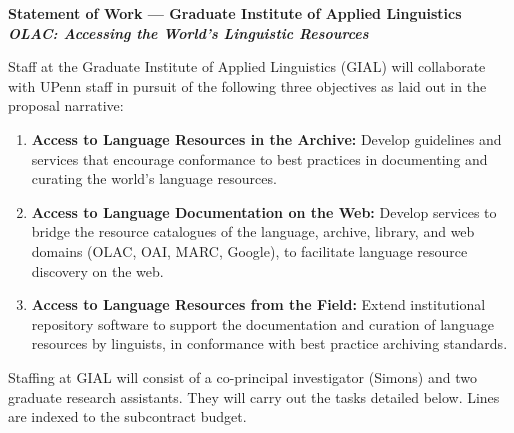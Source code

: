 \documentclass[11pt]{nsf}
\begin{document}
\begin{center}\textbf{\Large
Statement of Work --- Graduate Institute of Applied Linguistics \\[2ex]
\itshape{OLAC: Accessing the World's Linguistic Resources}\\[2ex]
}\end{center}

Staff at the Graduate Institute of Applied Linguistics (GIAL) will
collaborate with UPenn staff in pursuit of the following three
objectives as laid out in the proposal narrative:

\begin{enumerate}
\item \textbf{Access to Language Resources in the Archive:}
  Develop guidelines and services that encourage conformance to best
  practices in documenting and curating the world's language resources.
\item \textbf{Access to Language Documentation on the Web:}
  Develop services to bridge the resource catalogues of the
  language, archive, library, and web domains (OLAC, OAI, MARC,
  Google), to facilitate language resource discovery on the web.
\item \textbf{Access to Language Resources from the Field:}
  Extend institutional repository software to support the
  documentation and curation of language resources by linguists,
  in conformance with best practice archiving standards.
\end{enumerate}

Staffing at GIAL will consist of a co-principal investigator (Simons)
and two graduate research assistants.  They will carry out the tasks
detailed below.  Lines are indexed to the subcontract budget.
\end{document}
